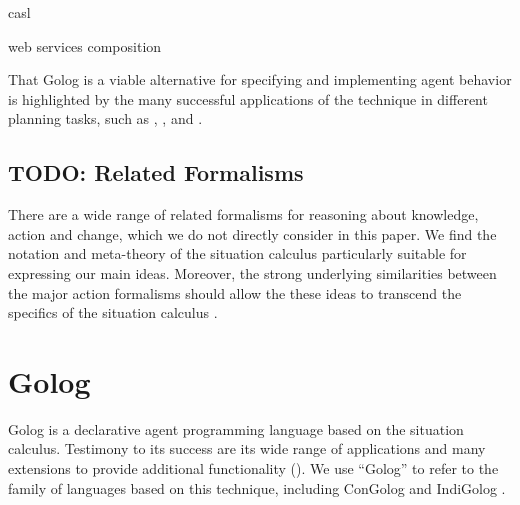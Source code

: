 casl \citep{shapiro02casl,lesperance05ecasl}

web services composition \citep{mcilraith02golog_web_services}

That Golog is a viable alternative for specifying and implementing
agent behavior is highlighted by the many successful applications
of the technique in different planning tasks, such as \citep{Finzi00open_world_sitcalc},
\citep{pirri00planning_nat_acts}, and \citep{baier03golog_planning}.


\subsection{TODO: Related Formalisms}

There are a wide range of related formalisms for reasoning about knowledge,
action and change, which we do not directly consider in this paper.
We find the notation and meta-theory of the situation calculus particularly
suitable for expressing our main ideas. Moreover, the strong underlying
similarities between the major action formalisms should allow the
these ideas to transcend the specifics of the situation calculus \citet{thielscher06reconcile_sc_fc,thielscher07unifying_action_calculus,vanbentham07ml_sitcalc}.


\section{Golog\label{sec:Background:Golog}}

Golog \citet{levesque97golog} is a declarative agent programming
language based on the situation calculus. Testimony to its success
are its wide range of applications and many extensions to provide
additional functionality (\citet{giacomo00congolog,giacomo99indigolog,Ferrein2005readylog}).
We use {}``Golog'' to refer to the family of languages based on
this technique, including ConGolog \citet{giacomo00congolog} and
IndiGolog \citet{giacomo99indigolog}.

